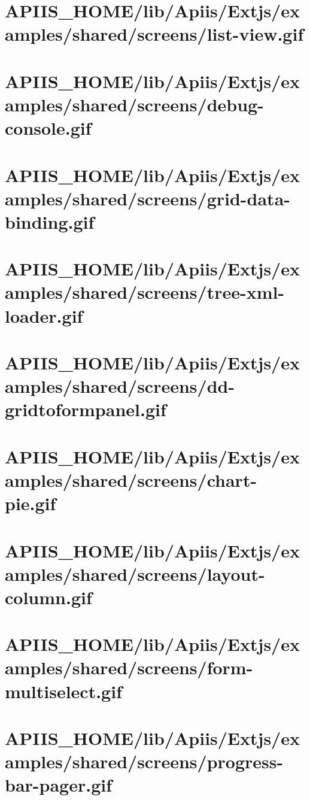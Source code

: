 \section{APIIS\_HOME/lib/Apiis/Extjs/examples/shared/screens/list-view.gif} 
\section{APIIS\_HOME/lib/Apiis/Extjs/examples/shared/screens/debug-console.gif} 
\section{APIIS\_HOME/lib/Apiis/Extjs/examples/shared/screens/grid-data-binding.gif} 
\section{APIIS\_HOME/lib/Apiis/Extjs/examples/shared/screens/tree-xml-loader.gif} 
\section{APIIS\_HOME/lib/Apiis/Extjs/examples/shared/screens/dd-gridtoformpanel.gif} 
\section{APIIS\_HOME/lib/Apiis/Extjs/examples/shared/screens/chart-pie.gif} 
\section{APIIS\_HOME/lib/Apiis/Extjs/examples/shared/screens/layout-column.gif} 
\section{APIIS\_HOME/lib/Apiis/Extjs/examples/shared/screens/form-multiselect.gif} 
\section{APIIS\_HOME/lib/Apiis/Extjs/examples/shared/screens/progress-bar-pager.gif} 
